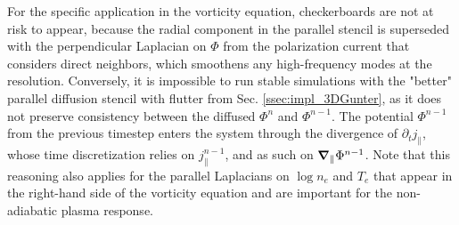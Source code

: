 For the specific application in the vorticity equation, checkerboards are not at risk to appear, because the radial component in the parallel stencil is superseded with the perpendicular Laplacian on $\Phi$ from the polarization current that considers direct neighbors, which smoothens any high-frequency modes at the resolution. Conversely, it is impossible to run stable simulations with the "better" parallel diffusion stencil with flutter from Sec. \ref{ssec:impl_3DGunter}, as it does not preserve consistency between the diffused $\Phi^n$ and $\Phi^{n-1}$. The potential $\Phi^{n-1}$ from the previous timestep enters the system through the divergence of $\partial_t j_\parallel$, whose time discretization relies on $j_\parallel^{n-1}$, and as such on $\grad_\parallel \Phi^{n-1}$. Note that this reasoning also applies for the parallel Laplacians on $\log n_e$ and $T_e$ that appear in the right-hand side of the vorticity equation and are important for the non-adiabatic plasma response. 
 





